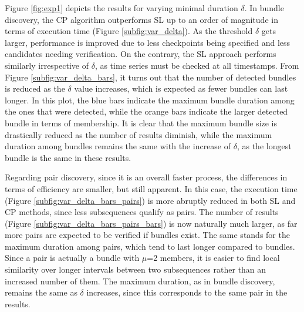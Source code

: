 Figure \ref{fig:exp1} depicts the results for varying minimal duration $\delta$. In bundle discovery, the CP algorithm outperforms SL up to an order of magnitude in terms of execution time (Figure \ref{subfig:var_delta}). As the threshold $\delta$ gets larger, performance is improved due to less checkpoints being specified and less candidates needing verification. On the contrary, the SL approach performs similarly irrespective of $\delta$, as time series must be checked at all timestamps. From Figure \ref{subfig:var_delta_bars}, it turns out that the number of detected bundles is reduced as the $\delta$ value increases, which is expected as fewer bundles can last longer. In this plot, the blue bars indicate the maximum bundle duration among the ones that were detected, while the orange bars indicate the larger detected bundle in terms of membership. It is clear that the maximum bundle size is drastically reduced as the number of results diminish, while the maximum duration among bundles remains the same with the increase of $\delta$, as the longest bundle is the same in these results.

Regarding pair discovery, since it is an overall faster process, the differences in terms of efficiency are smaller, but still apparent. In this case, the execution time (Figure \ref{subfig:var_delta_bars_pairs}) is more abruptly reduced in both SL and CP methods, since less subsequences qualify as pairs. The number of results (Figure \ref{subfig:var_delta_bars_pairs_bars}) is now naturally much larger, as far more pairs are expected to be verified if bundles exist. The same stands for the maximum duration among pairs, which tend to last longer compared to bundles. Since a pair is actually a bundle with $\mu$=2 members, it is easier to find local similarity over longer intervals between two subsequences rather than an increased number of them. The maximum duration, as in bundle discovery, remains the same as $\delta$ increases, since this corresponds to the same pair in the results. 

